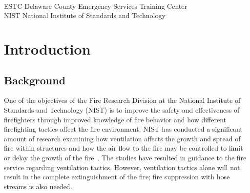 \documentclass[12pt,oneside]{book}
\begin{document}
\begin{tabbing}
\hspace{1.5in} \= \\
ESTC \> Delaware County Emergency Services Training Center \\
NIST \> National Institute of Standards and Technology \\
\end{tabbing}

\newpage


\mainmatter


\chapter{Introduction}
\label{chap:intro}
\section{Background}
\label{sec:background}

One of the objectives of the Fire Research Division at the National Institute of Standards and Technology (NIST) is to improve the safety and effectiveness of firefighters through improved knowledge of fire behavior and how different firefighting tactics affect the fire environment. NIST has conducted a significant amount of research examining how ventilation affects the growth and spread of fire within structures and how the air flow to the fire may be controlled to limit or delay the growth of the fire~\cite{madrzykowski2009fire,kerber2009fire}. The studies have resulted in guidance to the fire service regarding ventilation tactics. However, ventilation tactics alone will not result in the complete extinguishment of the fire; fire suppression with hose streams is also needed.
\end{document}
